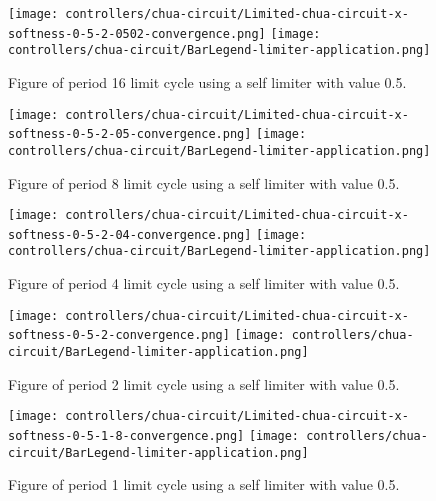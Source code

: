 \documentclass[main]{subfiles}
\begin{document}
\begin{figure}[H]
\centering
\texttt{[image: controllers/chua-circuit/Limited-chua-circuit-x-softness-0-5-2-0502-convergence.png]}
\texttt{[image: controllers/chua-circuit/BarLegend-limiter-application.png]}
\caption[Figure of period 16 limit cycle using a 0.5 soft limiter]{Figure of period 16 limit cycle using a self limiter with value 0.5.}
\label{figure:x-0.5-16-limit-cycle-trajectory}
\end{figure}

\begin{figure}[H]
\centering
\texttt{[image: controllers/chua-circuit/Limited-chua-circuit-x-softness-0-5-2-05-convergence.png]}
\texttt{[image: controllers/chua-circuit/BarLegend-limiter-application.png]}
\caption[Figure of period 8 limit cycle using a 0.5 soft limiter]{Figure of period 8 limit cycle using a self limiter with value 0.5.}
\label{figure:x-0.5-8-limit-cycle-trajectory}
\end{figure}

\begin{figure}[H]
\centering
\texttt{[image: controllers/chua-circuit/Limited-chua-circuit-x-softness-0-5-2-04-convergence.png]}
\texttt{[image: controllers/chua-circuit/BarLegend-limiter-application.png]}
\caption[Figure of period 4 limit cycle using a 0.5 soft limiter]{Figure of period 4 limit cycle using a self limiter with value 0.5.}
\label{figure:x-0.5-4-limit-cycle-trajectory}
\end{figure}

\begin{figure}[H]
\centering
\texttt{[image: controllers/chua-circuit/Limited-chua-circuit-x-softness-0-5-2-convergence.png]}
\texttt{[image: controllers/chua-circuit/BarLegend-limiter-application.png]}
\caption[Figure of period 2 limit cycle using a 0.5 soft limiter]{Figure of period 2 limit cycle using a self limiter with value 0.5.}
\label{figure:x-0.5-2-limit-cycle-trajectory}
\end{figure}

\begin{figure}[H]
\centering
\texttt{[image: controllers/chua-circuit/Limited-chua-circuit-x-softness-0-5-1-8-convergence.png]}
\texttt{[image: controllers/chua-circuit/BarLegend-limiter-application.png]}
\caption[Figure of period 1 limit cycle using a 0.5 soft limiter]{Figure of period 1 limit cycle using a self limiter with value 0.5.}
\label{figure:x-0.5-1-limit-cycle-trajectory}
\end{figure}
\end{document}
